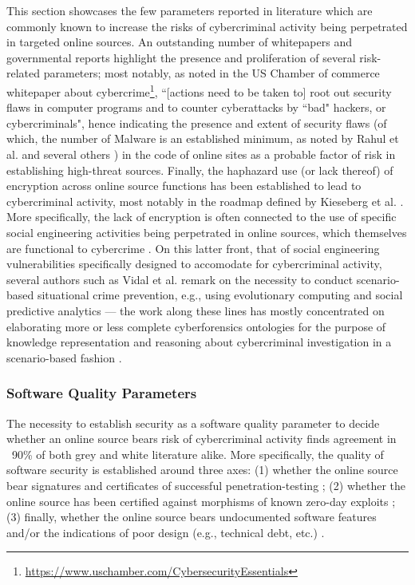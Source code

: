This section showcases the few parameters reported in literature which are commonly known to increase the risks of cybercriminal activity being perpetrated in targeted online sources. An outstanding number of whitepapers and governmental reports highlight the presence and proliferation of several risk-related parameters; most notably, as noted in the US Chamber of commerce whitepaper about cybercrime\footnote{\url{https://www.uschamber.com/CybersecurityEssentials}}, ``[actions need to be taken to] root out security flaws in computer programs and to counter cyberattacks by ``bad" hackers, or cybercriminals", hence indicating the presence and extent of security flaws (of which, the number of Malware is an established minimum, as noted by Rahul et al. \cite{Rahul} and several others \cite{Caballero12}) in the code of online sites as a probable factor of risk in establishing high-threat sources. Finally, the haphazard use (or lack thereof) of encryption across online source functions has been established to lead to cybercriminal activity, most notably in the roadmap defined by Kieseberg et al. \cite{KiesebergSR15}. More specifically, the lack of encryption is often connected to the use of specific social engineering activities being perpetrated in online sources, which themselves are functional to cybercrime \cite{Gharibi}. On this latter front, that of social engineering vulnerabilities specifically designed to accomodate for cybercriminal activity, several authors such as Vidal et al. \cite{VidalC17} remark on the necessity to conduct scenario-based situational crime prevention, e.g., using evolutionary computing and social predictive analytics --- the work along these lines has mostly concentrated on elaborating more or less complete cyberforensics ontologies for the purpose of knowledge representation and reasoning about cybercriminal investigation in a scenario-based fashion \cite{ParkCK09}.

\subsubsection{Software Quality Parameters}

The necessity to establish security as a software quality parameter to decide whether an online source bears risk of cybercriminal activity finds agreement in ~90\% of both grey and white literature alike. More specifically, the quality of software security is established around three axes: (1) whether the online source bear signatures and certificates of successful penetration-testing \cite{franklin}; (2) whether the online source has been certified against morphisms \cite{li06ieee} of known zero-day exploits \cite{Danforth11,BilgeD13}; (3) finally, whether the online source bears undocumented software features and/or the indications of poor design (e.g., technical debt, etc.) \cite{NordOSSK16}.


